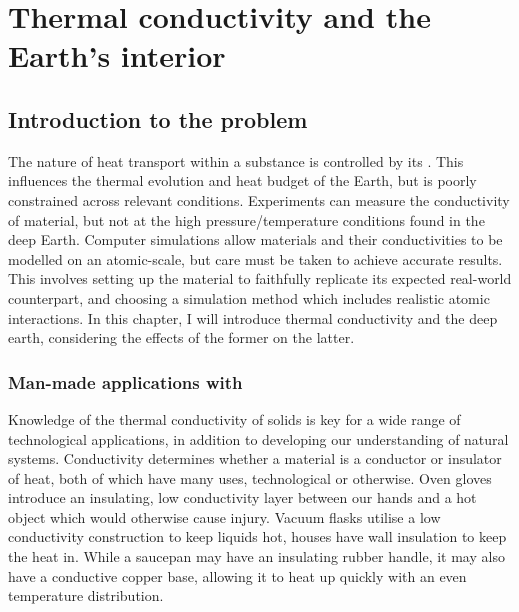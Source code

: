 \chapter{Thermal conductivity and the Earth's interior} %

\label{Chapter1} %




\section{Introduction to the problem}

The nature of heat transport within a substance is controlled by its \tc. This influences the thermal evolution and heat budget of the Earth, but is poorly constrained across relevant conditions. Experiments can measure the conductivity of material, but not at the high pressure/temperature conditions found in the deep Earth. Computer simulations allow materials and their conductivities to be modelled on an atomic-scale, but care must be taken to achieve accurate results. This involves setting up the material to faithfully replicate its expected real-world counterpart, and choosing a simulation method which includes realistic atomic interactions. In this chapter, I will introduce thermal conductivity and the deep earth, considering the effects of the former on the latter.

\subsection{Man-made applications with \tc}
Knowledge of the thermal conductivity of solids is key for a wide range of technological applications, in addition to developing our understanding of natural systems. Conductivity determines whether a material is a conductor or insulator of heat, both of which have many uses, technological or otherwise. Oven gloves introduce an insulating, low conductivity layer between our hands and a hot object which would otherwise cause injury. Vacuum flasks utilise a low conductivity construction to keep liquids hot, houses have wall insulation to keep the heat in. While a saucepan may have an insulating rubber handle, it may also have a conductive copper base, allowing it to heat up quickly with an even temperature distribution.

